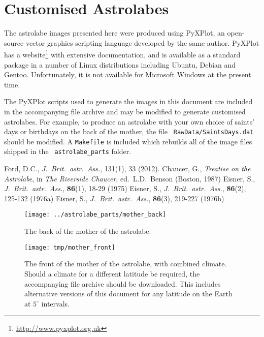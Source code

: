 \documentclass[a4paper,onecolumn,10pt]{article}
\begin{document}
\section*{Customised Astrolabes}

The astrolabe images presented here were produced using PyXPlot, an open-source
vector graphics scripting language developed by the same author.  PyXPlot has a
website\footnote{\url{http://www.pyxplot.org.uk}} with extensive documentation,
and is available as a standard package in a number of Linux distributions
including Ubuntu, Debian and Gentoo. Unfortunately, it is not available for
Microsoft Windows at the present time.

The PyXPlot scripts used to generate the images in this document are included
in the accompanying file archive and may be modified to generate customised
astrolabes. For example, to produce an astrolabe with your own choice of
saints' days or birthdays on the back of the mother, the file {\tt
Raw\-Data/\-Saints\-Days\-.dat} should be modified. A {\tt Makefile} is
included which rebuilds all of the image files shipped in the {\tt
astrolabe\_parts} folder.

\begin{thebibliography}{9}
Ford, D.C., \textit{J.\ Brit.\ astr.\ Ass.}, 131(1), 33 (2012).
Chaucer, G., \textit{Treatise on the Astrolabe}, in {\it The Riverside Chaucer}, ed.\ L.D.\ Benson (Boston, 1987)
Eisner, S., \textit{J.\ Brit.\ astr.\ Ass.}, \textbf{86}(1), 18-29 (1975)
Eisner, S., \textit{J.\ Brit.\ astr.\ Ass.}, \textbf{86}(2), 125-132 (1976a)
Eisner, S., \textit{J.\ Brit.\ astr.\ Ass.}, \textbf{86}(3), 219-227 (1976b)
\end{thebibliography}

\newpage

\begin{figure}
\centerline{\texttt{[image: ../astrolabe\_parts/mother\_back]}}
\caption{The back of the mother of the astrolabe.}
\label{mother_back}
\end{figure}

\begin{figure}
\centerline{\texttt{[image: tmp/mother\_front]}}
\caption{The front of the mother of the astrolabe, with combined climate.
Should a climate for a different latitude be required, the accompanying file archive should be downloaded. This includes alternative versions of this document for any latitude on the Earth at $5^\circ$ intervals.}
\label{mother_front}
\end{figure}
\end{document}
